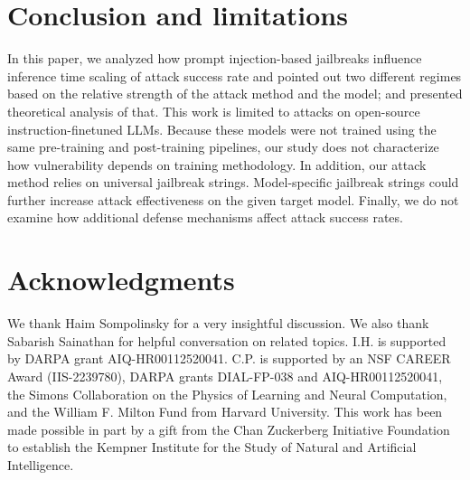 \documentclass{article}
\theoremstyle{remark} %
\begin{document}
\section{Conclusion and limitations}
In this paper, we analyzed how prompt injection-based jailbreaks influence inference time scaling of attack success rate and pointed out two different regimes based on the relative strength of the attack method and the model; and presented theoretical analysis of that. This work is limited to attacks on open-source instruction-finetuned LLMs. Because these models were not trained using the same pre-training and post-training pipelines, our study does not characterize how vulnerability depends on training methodology. In addition, our attack method relies on universal jailbreak strings. Model-specific jailbreak strings could further increase attack effectiveness on the given target model. Finally, we do not examine how additional defense mechanisms affect attack success rates. 


\section*{Acknowledgments}

We thank Haim Sompolinsky for a very insightful discussion. 
We also thank Sabarish Sainathan for helpful conversation on related topics. I.H. is supported by DARPA grant AIQ-HR00112520041. C.P. is supported by an NSF CAREER Award (IIS-2239780), DARPA grants DIAL-FP-038 and AIQ-HR00112520041, the Simons Collaboration on the Physics of Learning and Neural Computation, and the William F. Milton Fund from Harvard University. This work has been made possible in part by a gift from the Chan Zuckerberg Initiative Foundation to establish the Kempner Institute for the Study of Natural and Artificial Intelligence. 


\newpage



















\end{document}
